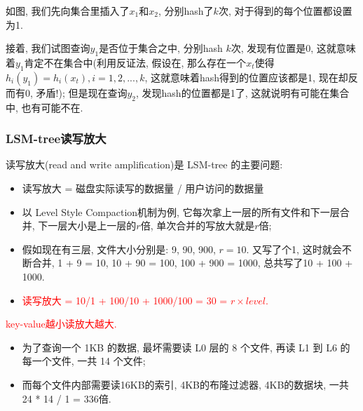 如图, 我们先向集合里插入了$x_1$和$x_2$, 分别hash了$k$次, 对于得到的每个位置都设置为1.

接着, 我们试图查询$y_1$是否位于集合之中, 分别hash $k$次, 发现有位置是0, 这就意味着$y_1$肯定不在集合中(利用反证法, 假设在, 那么存在一个$x_t$使得$h_i(y_1)=h_i(x_t), i=1,2,...,k$, 这就意味着hash得到的位置应该都是1, 现在却反而有0, 矛盾!); 但是现在查询$y_2$, 发现hash的位置都是1了, 这就说明有可能在集合中, 也有可能不在.

\subsubsection{LSM-tree读写放大}

读写放大(read and write amplification)是 LSM-tree 的主要问题:
\begin{itemize}
    \item 读写放大 = 磁盘实际读写的数据量 / 用户访问的数据量
\end{itemize}

\begin{itemize}
    \item 以 Level Style Compaction机制为例, 它每次拿上一层的所有文件和下一层合并, 下一层大小是上一层的$ r $倍, 单次合并的写放大就是$r$倍;
    \item 假如现在有三层, 文件大小分别是: 9, 90, 900, $r=10$. 又写了个1, 这时就会不断合并, 1 + 9 = 10, 10 + 90 = 100, 100 + 900 = 1000, 总共写了10 + 100 + 1000.
    \item \textcolor{red}{读写放大 = 10/1 + 100/10 + 1000/100 = 30 = $r \times level$.}
\end{itemize}

\textcolor{red}{key-value越小读放大越大.}
\begin{itemize}
    \item 为了查询一个 1KB 的数据, 最坏需要读 L0 层的 8 个文件, 再读 L1 到 L6 的每一个文件, 一共 14 个文件;
    \item 而每个文件内部需要读16KB的索引, 4KB的布隆过滤器, 4KB的数据块, 一共 24 * 14 / 1 = 336倍.
\end{itemize}